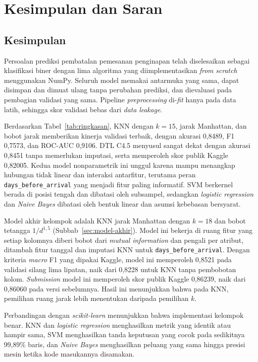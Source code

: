 \clearpage
\section{Kesimpulan dan Saran}
\subsection{Kesimpulan}
Persoalan prediksi pembatalan pemesanan penginapan telah diselesaikan sebagai klasifikasi biner dengan lima algoritma yang diimplementasikan \textit{from scratch} menggunakan NumPy. Seluruh model memakai antarmuka yang sama, dapat disimpan dan dimuat ulang tanpa perubahan prediksi, dan dievaluasi pada pembagian validasi yang sama. Pipeline \textit{preprocessing} di-\textit{fit} hanya pada data latih, sehingga skor validasi bebas dari \textit{data leakage}.

Berdasarkan Tabel~\ref{tab:ringkasan}, KNN dengan $k=15$, jarak Manhattan, dan bobot jarak memberikan kinerja validasi terbaik, dengan akurasi 0,8489, F1 0,7573, dan ROC-AUC 0,9106. DTL C4.5 menyusul sangat dekat dengan akurasi 0,8451 tanpa memerlukan imputasi, serta memperoleh skor publik Kaggle 0,82005. Kedua model nonparametrik ini unggul karena mampu menangkap hubungan tidak linear dan interaksi antarfitur, terutama peran \texttt{days\_before\_arrival} yang menjadi fitur paling informatif. SVM berkernel berada di posisi tengah dan dibatasi oleh subsampel, sedangkan \textit{logistic regression} dan \textit{Naive Bayes} dibatasi oleh bentuk linear dan asumsi kebebasan bersyarat.

Model akhir kelompok adalah KNN jarak Manhattan dengan $k=18$ dan bobot tetangga $1/d^{1{,}5}$ (Subbab~\ref{sec:model-akhir}). Model ini bekerja di ruang fitur yang setiap kolomnya diberi bobot dari \textit{mutual information} dan pengali per atribut, ditambah fitur tanggal dan imputasi KNN untuk \texttt{days\_before\_arrival}. Dengan kriteria \textit{macro} F1 yang dipakai Kaggle, model ini memperoleh 0,8521 pada validasi silang lima lipatan, naik dari 0,8228 untuk KNN tanpa pembobotan kolom. \textit{Submission} model ini memperoleh skor publik Kaggle 0,86239, naik dari 0,86060 pada versi sebelumnya. Hasil ini menunjukkan bahwa pada KNN, pemilihan ruang jarak lebih menentukan daripada pemilihan $k$.

Perbandingan dengan \textit{scikit-learn} menunjukkan bahwa implementasi kelompok benar. KNN dan \textit{logistic regression} menghasilkan metrik yang identik atau hampir sama, SVM menghasilkan tanda keputusan yang cocok pada sedikitnya 99,89\% baris, dan \textit{Naive Bayes} menghasilkan peluang yang sama hingga presisi mesin ketika kode masukannya disamakan.

